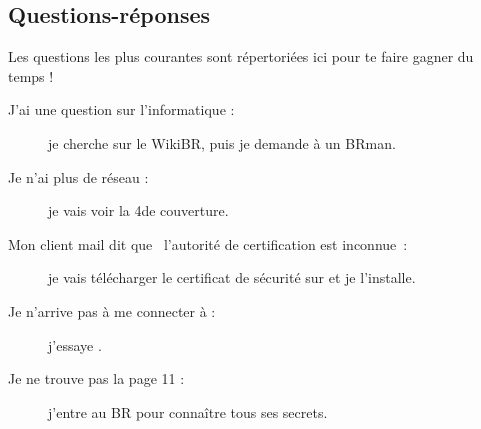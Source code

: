 \subsection{Questions-r\'eponses}

Les questions les plus courantes sont r\'epertori\'ees ici pour te faire gagner du temps !

\begin{description}

\item[J'ai une question sur l'informatique : ] je cherche sur le WikiBR, puis je demande \`a un BRman.

\item[Je n'ai plus de r\'eseau : ] je vais voir la 4\ieme de couverture.

\item[Mon client mail dit que \guillemotleft~l'autorit\'e de certification est inconnue~\guillemotright : ] je vais t\'el\'echarger le certificat de s\'ecurit\'e
sur  et je l'installe.


\item[Je n'arrive pas \`a me connecter \`a  : ] j'essaye .



\item[Je ne trouve pas la page 11 : ] j'entre au BR pour conna\^itre tous ses secrets.

\end{description}
